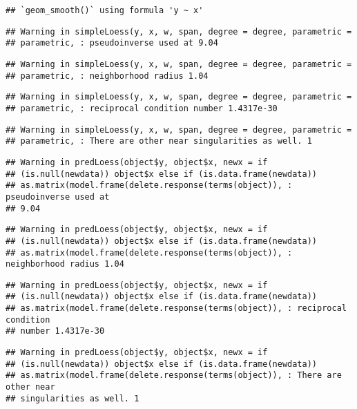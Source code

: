 \documentclass[
]{article}
\begin{document}
\begin{verbatim}
## `geom_smooth()` using formula 'y ~ x'
\end{verbatim}

\begin{verbatim}
## Warning in simpleLoess(y, x, w, span, degree = degree, parametric =
## parametric, : pseudoinverse used at 9.04
\end{verbatim}

\begin{verbatim}
## Warning in simpleLoess(y, x, w, span, degree = degree, parametric =
## parametric, : neighborhood radius 1.04
\end{verbatim}

\begin{verbatim}
## Warning in simpleLoess(y, x, w, span, degree = degree, parametric =
## parametric, : reciprocal condition number 1.4317e-30
\end{verbatim}

\begin{verbatim}
## Warning in simpleLoess(y, x, w, span, degree = degree, parametric =
## parametric, : There are other near singularities as well. 1
\end{verbatim}

\begin{verbatim}
## Warning in predLoess(object$y, object$x, newx = if
## (is.null(newdata)) object$x else if (is.data.frame(newdata))
## as.matrix(model.frame(delete.response(terms(object)), : pseudoinverse used at
## 9.04
\end{verbatim}

\begin{verbatim}
## Warning in predLoess(object$y, object$x, newx = if
## (is.null(newdata)) object$x else if (is.data.frame(newdata))
## as.matrix(model.frame(delete.response(terms(object)), : neighborhood radius 1.04
\end{verbatim}

\begin{verbatim}
## Warning in predLoess(object$y, object$x, newx = if
## (is.null(newdata)) object$x else if (is.data.frame(newdata))
## as.matrix(model.frame(delete.response(terms(object)), : reciprocal condition
## number 1.4317e-30
\end{verbatim}

\begin{verbatim}
## Warning in predLoess(object$y, object$x, newx = if
## (is.null(newdata)) object$x else if (is.data.frame(newdata))
## as.matrix(model.frame(delete.response(terms(object)), : There are other near
## singularities as well. 1
\end{verbatim}
\end{document}
